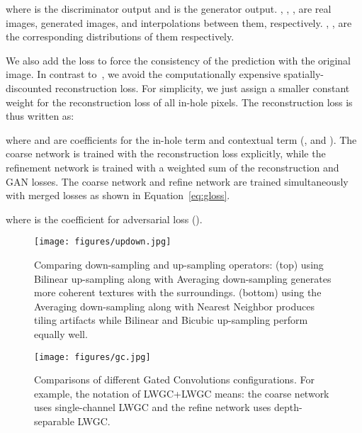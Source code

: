 \documentclass[oribibl]{llncs}  \usepackage[width=122mm,left=12mm,paperwidth=146mm,height=193mm,top=12mm,paperheight=217mm]{geometry}
\begin{document}
\noindent where  is the discriminator output and  is the generator output. , , , are real images, generated images, and interpolations between them, respectively. , ,  are the corresponding distributions of them respectively.



We also add the  loss to force the consistency of the prediction with the original image. In contrast to~\cite{yu2018generative}, we avoid the computationally expensive spatially-discounted reconstruction loss. For simplicity, we just assign a smaller constant weight for the reconstruction loss of all in-hole pixels. The reconstruction loss is thus written as:


\small






\normalsize
\noindent where  and  are coefficients for the in-hole term and contextual term (, and ). The coarse network is trained with the reconstruction loss explicitly, while the refinement network is trained with a weighted sum of the reconstruction and GAN losses. The coarse network and refine network are trained simultaneously with merged losses as shown in Equation~\ref{eq:gloss}.


\noindent where  is the coefficient for adversarial loss ().

\begin{figure*}[t]
\begin{center}
  \texttt{[image: figures/updown.jpg]} 
\end{center}
   \caption{Comparing down-sampling and up-sampling operators: (top) using Bilinear up-sampling along with Averaging down-sampling generates more coherent textures with the surroundings. (bottom) using the Averaging down-sampling along with Nearest Neighbor produces tiling artifacts while Bilinear and Bicubic up-sampling perform equally well.}
\label{fig:amblation-downup}
\end{figure*}

\begin{figure*}[t]
\begin{center}
  \texttt{[image: figures/gc.jpg]} 
\end{center}
   \caption{Comparisons of different Gated Convolutions configurations. For example, the notation of LWGC+LWGC means: the coarse network uses single-channel LWGC and the refine network uses depth-separable LWGC.}
\label{fig:amblation-gc}
\end{figure*}
\end{document}
